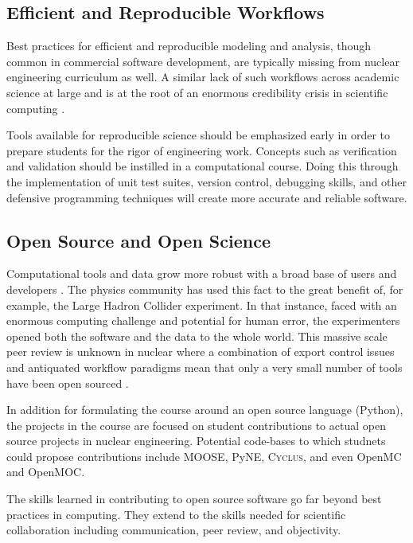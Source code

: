 \documentclass{anstrans}
\begin{document}
\subsection{Efficient and Reproducible Workflows}

Best practices for efficient and reproducible modeling and analysis, though
common in commercial software development, are typically missing from nuclear
engineering curriculum as well. A similar lack of such workflows across
academic science at large and is  at the root of an enormous credibility
crisis in scientific computing \cite{donoho_reproducible_2009,
stodden_scientific_2010}.

Tools available for reproducible science should be emphasized early in order to
prepare students for the rigor of engineering work. Concepts such as
verification and validation should be instilled in a computational course.
Doing this through the implementation of unit test suites, version control,
debugging skills, and other defensive programming techniques will create
more accurate and reliable software.

\subsection{Open Source and Open Science}

Computational tools and data grow more robust with a broad base of users and
developers \cite{petre_code_2014, wicherts_willingness_2013}. The physics
community has used this fact to the great benefit of, for example, the Large
Hadron Collider experiment. In that instance, faced with an enormous computing
challenge and potential for human error, the experimenters opened both the
software and the data to the whole world. This massive scale peer review is
unknown in nuclear where a combination of export control issues and antiquated
workflow paradigms mean that only a very small number of tools have been open
sourced \cite{moose}\cite{pyne}\cite{cyclus}.

In addition for formulating the course around an open source language (Python),
the projects in the course are focused on student contributions to actual open source
projects in nuclear engineering. Potential code-bases to which studnets could
propose contributions include MOOSE\cite{gaston_moose_year},
PyNE\cite{scopatz_pyne_year}, \textsc{Cyclus}\cite{cyclus}, and
even OpenMC\cite{openmc} and OpenMOC\cite{openmoc}.

The skills learned in contributing to open source software go far beyond best
practices in computing. They extend to the skills needed for scientific
collaboration including communication, peer review, and objectivity.
\end{document}
